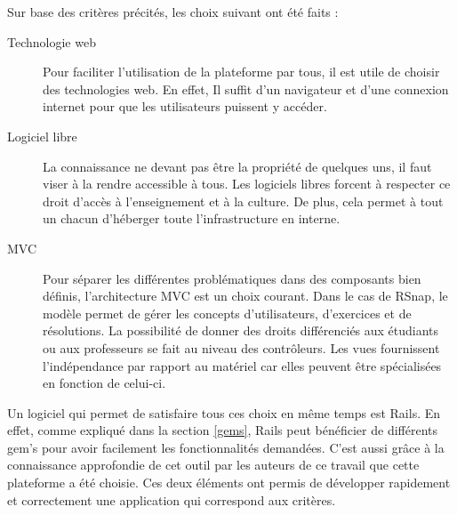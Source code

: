 Sur base des critères précités, les choix suivant ont été faits :
\begin{description}
  \item[Technologie web] Pour faciliter l'utilisation de la plateforme par tous, il est utile de choisir des technologies web. En effet, Il suffit d'un navigateur et d'une connexion internet pour que les utilisateurs puissent y accéder.
  \item[Logiciel libre] La connaissance ne devant pas être la propriété de quelques uns, il faut viser à la rendre accessible à tous. Les logiciels libres forcent à respecter ce droit d'accès à l'enseignement et à la culture. De plus, cela permet à tout un chacun d'héberger toute l'infrastructure en interne.
  \item[MVC] Pour séparer les différentes problématiques dans des composants bien définis, l'architecture MVC est un choix courant. Dans le cas de RSnap, le modèle permet de gérer les concepts d'utilisateurs, d'exercices et de résolutions. La possibilité de donner des droits différenciés aux étudiants ou aux professeurs se fait au niveau des contrôleurs. Les vues fournissent l'indépendance par rapport au matériel car elles peuvent être spécialisées en fonction de celui-ci.
\end{description}
Un logiciel qui permet de satisfaire tous ces choix en même temps est Rails. En effet, comme expliqué dans la section \ref{gems}, Rails peut bénéficier de différents gem's pour avoir facilement les fonctionnalités demandées. C'est aussi grâce à la connaissance approfondie de cet outil par les auteurs de ce travail que cette plateforme a été choisie. Ces deux éléments ont permis de développer rapidement et correctement une application qui correspond aux critères. 



